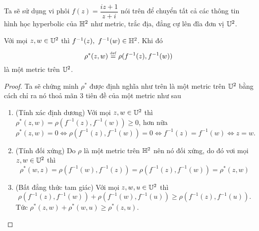 \begin{remark*}
    Ta sẽ sử dụng vi phôi $f(z) = \dfrac{iz+1}{z+i}$ nói trên để chuyển tất cả các thông tin hình học hyperbolic của $\mathbb{H}^2$ như metric, trắc địa, đẳng cự lên đĩa đơn vị $\mathbb{U}^2$.
\end{remark*}
\begin{defn}
    Với mọi $z,w \in \mathbb{U}^2$ thì $f^{-1}(z),~f^{-1}(w) \in \mathbb{H}^2$. Khi đó \[\rho^*(z,w) \overset{\underset{\mathrm{def}}{}}{=} \rho(f^{-1}(z), f^{-1}(w))\]
    là một metric trên $\mathbb{U}^2$.
\end{defn}
\begin{proof}
    Ta sẽ chứng minh $\rho^*$ được định nghĩa như trên là một metric trên $\mathbb{U}^2$ bằng cách chỉ ra nó thoả mãn 3 tiên đề của một metric như sau
    \begin{enumerate}
        \item (Tính xác định dương) Với mọi $z,w \in \mathbb{U}^2$ thì $\rho^*(z,w) = \rho(f^{-1}(z), f^{-1}(w))\geq 0$, hơn nữa 
        \[\rho^*(z,w) = 0 \Leftrightarrow \rho(f^{-1}(z), f^{-1}(w)) = 0 \Leftrightarrow f^{-1}(z) = f^{-1}(w) \Leftrightarrow z = w.\]
        \item (Tính đối xứng) Do $\rho$ là một metric trên $\mathbb{H}^2$ nên nó đối xứng, do đó vơi mọi $z, w \in \mathbb{U}^2$ thì 
        \[\rho^*(w,z) = \rho(f^{-1}(w), f^{-1}(z)) = \rho(f^{-1}(z), f^{-1}(w)) = \rho^*(z,w)\]
        \item (Bất đẳng thức tam giác) Với mọi $z,w,u \in \mathbb{U}^2$ thì 
        \[\rho(f^{-1}(z), f^{-1}(w)) + \rho(f^{-1}(w), f^{-1}(u)) \geq \rho(f^{-1}(z), f^{-1}(u)).\]
        Tức $\rho^*(z,w) + \rho^*(w,u) \geq \rho^*(z,u).$
    \end{enumerate}
\end{proof}
